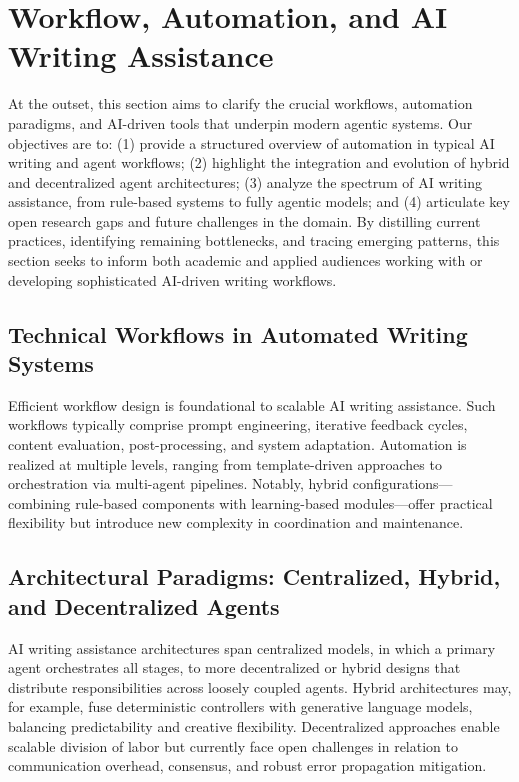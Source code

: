 \documentclass[sigconf]{acmart}
\begin{document}
\section{Workflow, Automation, and AI Writing Assistance}

At the outset, this section aims to clarify the crucial workflows, automation paradigms, and AI-driven tools that underpin modern agentic systems. Our objectives are to: (1) provide a structured overview of automation in typical AI writing and agent workflows; (2) highlight the integration and evolution of hybrid and decentralized agent architectures; (3) analyze the spectrum of AI writing assistance, from rule-based systems to fully agentic models; and (4) articulate key open research gaps and future challenges in the domain. By distilling current practices, identifying remaining bottlenecks, and tracing emerging patterns, this section seeks to inform both academic and applied audiences working with or developing sophisticated AI-driven writing workflows.

\subsection{Technical Workflows in Automated Writing Systems}
Efficient workflow design is foundational to scalable AI writing assistance. Such workflows typically comprise prompt engineering, iterative feedback cycles, content evaluation, post-processing, and system adaptation. Automation is realized at multiple levels, ranging from template-driven approaches to orchestration via multi-agent pipelines. Notably, hybrid configurations—combining rule-based components with learning-based modules—offer practical flexibility but introduce new complexity in coordination and maintenance.

\subsection{Architectural Paradigms: Centralized, Hybrid, and Decentralized Agents}
AI writing assistance architectures span centralized models, in which a primary agent orchestrates all stages, to more decentralized or hybrid designs that distribute responsibilities across loosely coupled agents. Hybrid architectures may, for example, fuse deterministic controllers with generative language models, balancing predictability and creative flexibility. Decentralized approaches enable scalable division of labor but currently face open challenges in relation to communication overhead, consensus, and robust error propagation mitigation.
\end{document}
